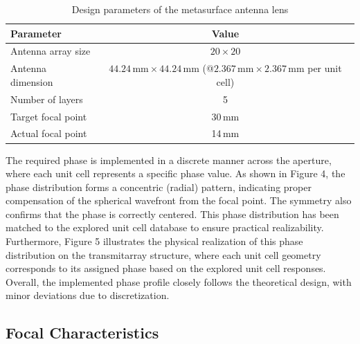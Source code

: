\begin{table}[h!]
	\begin{center}
		\caption{Design parameters of the metasurface antenna lens}
		\label{table:lens_design_parameters}
		\begin{tabular}{|l|c|}
			\hline
			\textbf{Parameter} & \textbf{Value} \\
			\hline
			Antenna array size & $20 \times 20$ \\
			Antenna dimension & $44.24\,\text{mm} \times 44.24\,\text{mm}$ (@$2.367\,\text{mm} \times 2.367\,\text{mm}$ per unit cell) \\
			Number of layers & 5 \\
			Target focal point & 30\,mm \\
            Actual focal point & 14\,mm \\
			\hline
		\end{tabular}
	\end{center}
\end{table}

The required phase is implemented in a discrete manner across the aperture, where each unit cell represents a specific phase value.
As shown in Figure 4, the phase distribution forms a concentric (radial) pattern, indicating proper compensation of the spherical wavefront from the focal point. The symmetry also confirms that the phase is correctly centered. This phase distribution has been matched to the explored unit cell database to ensure practical realizability.
Furthermore, Figure 5 illustrates the physical realization of this phase distribution on the transmitarray structure, where each unit cell geometry corresponds to its assigned phase based on the explored unit cell responses.
Overall, the implemented phase profile closely follows the theoretical design, with minor deviations due to discretization.


\subsection{Focal Characteristics}


